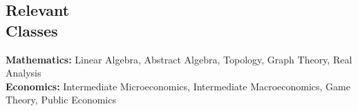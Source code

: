 \documentclass[margin, 10pt]{res} %
\begin{document}
\begin{resume}

\section{\sc Relevant \\ Classes}

\textbf{Mathematics:} Linear Algebra, Abstract Algebra, Topology, Graph Theory, Real Analysis\\
\textbf{Economics:} Intermediate Microeconomics, Intermediate Macroeconomics, Game Theory, Public Economics



\end{resume}
\end{document}
